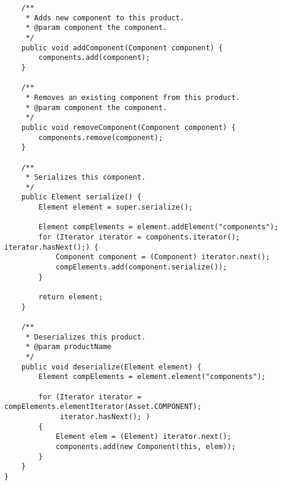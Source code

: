 \begin{verbatim}
	/**
	 * Adds new component to this product.
	 * @param component the component.
	 */
	public void addComponent(Component component) {
		components.add(component);
	}

	/**
	 * Removes an existing component from this product.
	 * @param component the component.
	 */
	public void removeComponent(Component component) {
		components.remove(component);
	}
	
	/**
	 * Serializes this component.
	 */
	public Element serialize() {
		Element element = super.serialize();

		Element compElements = element.addElement("components");
		for (Iterator iterator = components.iterator(); iterator.hasNext();) {
			Component component = (Component) iterator.next();
			compElements.add(component.serialize());
		}
		
		return element;
	}

	/**
	 * Deserializes this product.
	 * @param productName
	 */
	public void deserialize(Element element) {
		Element compElements = element.element("components");
		
		for (Iterator iterator = compElements.elementIterator(Asset.COMPONENT);
			 iterator.hasNext(); )
		{
			Element elem = (Element) iterator.next();
			components.add(new Component(this, elem));
		}
	}
}

\end{verbatim}
